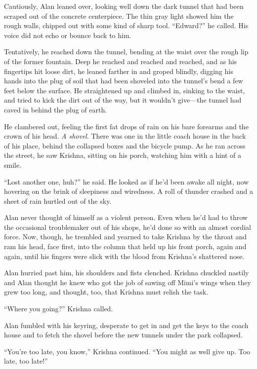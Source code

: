 \documentclass{article}
\begin{document}
Cautiously, Alan leaned over, looking well down the dark tunnel that
had been scraped out of the concrete centerpiece.  The thin gray light
showed him the rough walls, chipped out with some kind of sharp tool. 
``Edward?'' he called.  His voice did not echo or bounce back to him.

Tentatively, he reached down the tunnel, bending at the waist over the
rough lip of the former fountain.  Deep he reached and reached and
reached, and as his fingertips hit loose dirt, he leaned farther in
and groped blindly, digging his hands into the plug of soil that had
been shoveled into the tunnel's bend a few feet below the surface.  He
straightened up and climbed in, sinking to the waist, and tried to
kick the dirt out of the way, but it wouldn't give---the tunnel had
caved in behind the plug of earth.

He clambered out, feeling the first fat drops of rain on his bare
forearms and the crown of his head.  \textit{A shovel}.  There was one
in the little coach house in the back of his place, behind the
collapsed boxes and the bicycle pump.  As he ran across the street, he
saw Krishna, sitting on his porch, watching him with a hint of a
smile.

``Lost another one, huh?'' he said.  He looked as if he'd been awake
all night, now hovering on the brink of sleepiness and wiredness.  A
roll of thunder crashed and a sheet of rain hurtled out of the sky.

Alan never thought of himself as a violent person.  Even when he'd had
to throw the occasional troublemaker out of his shops, he'd done so
with an almost cordial force.  Now, though, he trembled and yearned to
take Krishna by the throat and ram his head, face first, into the
column that held up his front porch, again and again, until his
fingers were slick with the blood from Krishna's shattered nose.

Alan hurried past him, his shoulders and fists clenched.  Krishna
chuckled nastily and Alan thought he knew who got the job of sawing
off Mimi's wings when they grew too long, and thought, too, that
Krishna must relish the task.

``Where you going?'' Krishna called.

Alan fumbled with his keyring, desperate to get in and get the keys to
the coach house and to fetch the shovel before the new tunnels under
the park collapsed.

``You're too late, you know,'' Krishna continued.  ``You might as well
give up.  Too late, too late!''
\end{document}
